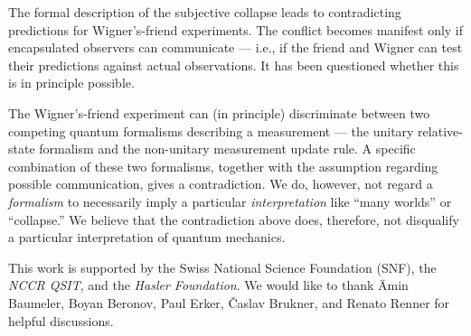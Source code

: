 \documentclass[aps,pra,twocolumn]{revtex4-1}
\theoremstyle{definition}
\theoremstyle{remark}
\begin{document}
The formal description of the subjective collapse leads to contradicting predictions for Wigner's-friend experiments. 
The conflict becomes manifest only if encapsulated observers can communicate --- i.e., if the friend and Wigner can test their predictions against actual observations. 
It has been questioned whether this is in principle possible.

The Wigner's-friend experiment can (in principle) discriminate between two competing quantum formalisms describing a measurement --- the unitary relative-state formalism and the non-unitary measurement update rule. 
A specific combination of these two formalisms, together with the assumption regarding possible communication, gives a contradiction.
We do, however, not regard a \emph{formalism} to necessarily imply a particular \emph{interpretation} like ``many worlds'' or ``collapse.''
We believe that the contradiction above does, therefore, not disqualify a particular interpretation of quantum mechanics.

 

\begin{acknowledgments}
\noindent
This work is supported by the Swiss National Science Foundation (SNF), the \emph{NCCR QSIT}, and the \emph{Hasler Foundation}. We would like to thank \"Amin Baumeler, Boyan Beronov, Paul Erker, \v Caslav Brukner, and Renato Renner for helpful discussions.
\end{acknowledgments}
\end{document}
